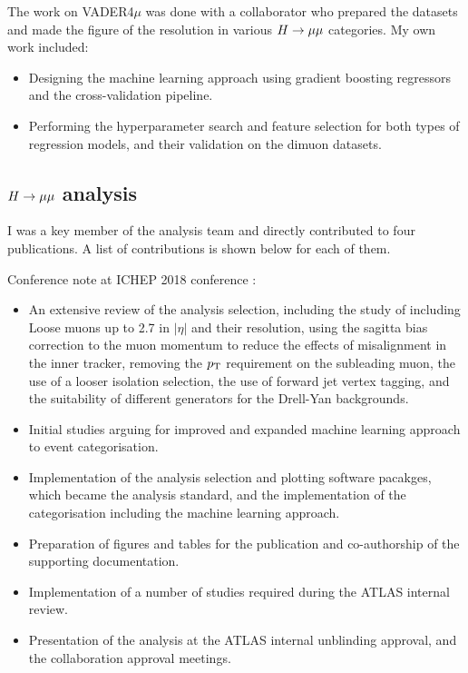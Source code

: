 \begin{originality}
\noindent The work on VADER4$\mu$ was done with a collaborator who
prepared the datasets and made the figure of the resolution
in various $H \rightarrow \mu\mu$ categories. My own work included:
\begin{itemize}
\item Designing the machine learning approach using 
gradient boosting regressors and the cross-validation
pipeline.
\item Performing the hyperparameter search and feature
selection for both types of regression models, and
their validation on the dimuon datasets.
\end{itemize}

\subsection*{$H \rightarrow \mu\mu$ analysis}

I was a key member of the analysis team and directly
contributed to four publications. A list of contributions
is shown below for each of them.

\noindent Conference note at ICHEP 2018 conference \cite{ATLAS-CONF-2018-026}:
\begin{itemize}
\item An extensive review of the analysis selection, including the study
of including Loose muons up to 2.7 in $|\eta|$ and their resolution,
using the sagitta bias correction to the muon momentum to reduce
the effects of misalignment in the inner tracker, removing the $p_{\text{T}}$
requirement on the subleading muon, the use of a looser isolation
selection, the use of forward jet vertex tagging, and the suitability
of different generators for the Drell-Yan backgrounds.
\item Initial studies arguing for improved and expanded machine
learning approach to event categorisation.
\item Implementation of the analysis selection and plotting software
pacakges, which became the analysis standard, and the implementation
of the categorisation including the machine learning approach.
\item Preparation of figures and tables for the publication and
co-authorship of the supporting documentation.
\item Implementation of a number of studies required during the
ATLAS internal review.
\item Presentation of the analysis at the ATLAS internal unblinding
approval, and the collaboration approval meetings.
\end{itemize}


\end{originality}
